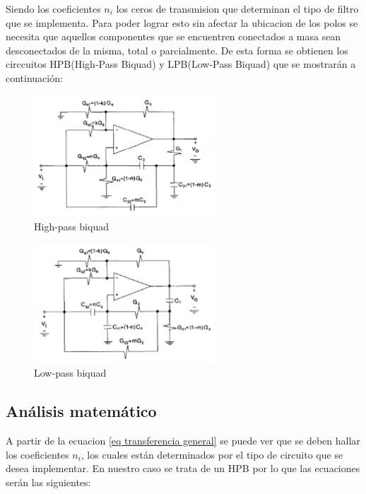 Siendo los coeficientes $n_i$ los ceros de transmision que determinan el tipo de filtro que se implementa. Para poder lograr esto sin afectar la ubicacion de los polos se necesita que aquellos componentes que se encuentren conectados a masa sean desconectados de la misma, total o parcialmente. De esta forma se obtienen los circcuitos HPB(High-Pass Biquad) y LPB(Low-Pass Biquad) que se mostrarán a continuación:

\begin{figure}[h]
	\includegraphics[width=0.6\textwidth]{../Ejercicio2-DisenoDeCeldas/3CeldaSedra/Imagenes/HP biquad.png}
	\centering
	\caption{High-pass biquad}
	\label{HPB}
\end{figure}

\begin{figure}[h]
	\includegraphics[width=0.6\textwidth]{../Ejercicio2-DisenoDeCeldas/3CeldaSedra/Imagenes/LP biquad.png}
	\centering
	\caption{Low-pass biquad}
	\label{LPB}
\end{figure}

\subsection{Análisis matemático}

A partir de la ecuacion \ref{eq transferencia general} se puede ver que se deben hallar los coeficientes $n_i$, los cuales están determinados por el tipo de circuito que se desea implementar. En nuestro caso se trata de un HPB por lo que las ecuaciones serán las siguientes:

